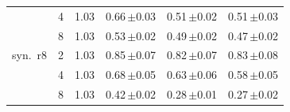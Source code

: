 \begin{tabular}{lrrrrr}
 & 4 & 1.03 & 0.66\,{\scriptsize$\pm$0.03} & 0.51\,{\scriptsize$\pm$0.02} & 0.51\,{\scriptsize$\pm$0.03} \\
 & 8 & 1.03 & 0.53\,{\scriptsize$\pm$0.02} & 0.49\,{\scriptsize$\pm$0.02} & 0.47\,{\scriptsize$\pm$0.02} \\
\midrule
syn.\ r8 & 2 & 1.03 & 0.85\,{\scriptsize$\pm$0.07} & 0.82\,{\scriptsize$\pm$0.07} & 0.83\,{\scriptsize$\pm$0.08} \\
 & 4 & 1.03 & 0.68\,{\scriptsize$\pm$0.05} & 0.63\,{\scriptsize$\pm$0.06} & 0.58\,{\scriptsize$\pm$0.05} \\
 & 8 & 1.03 & 0.42\,{\scriptsize$\pm$0.02} & 0.28\,{\scriptsize$\pm$0.01} & 0.27\,{\scriptsize$\pm$0.02} \\
\bottomrule
\end{tabular}
